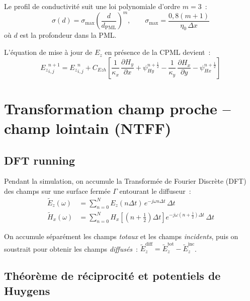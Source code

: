 \documentclass[12pt,a4paper]{article}
\newcommand{\Ez}{{E_z}}
\newcommand{\Hx}{{H_x}}
\newcommand{\Hy}{{H_y}}
\newcommand{\dx}{\Delta x}
\newcommand{\dt}{\Delta t}
\newcommand{\half}{\tfrac{1}{2}}
\numberwithin{equation}{section}
\numberwithin{figure}{section}
\numberwithin{table}{section}
\begin{document}
Le profil de conductivité suit une loi polynomiale d'ordre $m=3$~:
\begin{equation}
    \sigma(d) = \sigma_{\max}\left(\frac{d}{d_{\text{PML}}}\right)^m,
    \qquad
    \sigma_{\max} = \frac{0{,}8(m+1)}{\eta_0\,\dx}
    \label{eq:sigma_pml}
\end{equation}
où $d$ est la profondeur dans la PML.

L'équation de mise à jour de $\Ez$ en présence de la CPML devient~:
\begin{equation}
    {E_z}^{n+1}_{i,j} = {E_z}^n_{i,j} + C_{Ezh}
    \left[
        \frac{1}{\kappa_x}\,\frac{\partial \Hy}{\partial x} + \psi_{Hy}^{n+\half}
        - \frac{1}{\kappa_y}\,\frac{\partial \Hx}{\partial y} - \psi_{Hx}^{n+\half}
    \right]
    \label{eq:update_Ez_CPML}
\end{equation}

\section{Transformation champ proche -- champ lointain (NTFF)}

\subsection{DFT running}

Pendant la simulation, on accumule la Transformée de Fourier Discrète (DFT)
des champs sur une surface fermée $\Gamma$ entourant le diffuseur~:
\begin{align}
    \tilde{E}_z(\omega) &= \sum_{n=0}^{N} E_z(n\dt)\,e^{-j\omega n\dt}\,\dt
    \label{eq:DFT_Ez}\\
    \tilde{H}_x(\omega) &= \sum_{n=0}^{N} H_x\!\left[(n+\half)\dt\right]
                e^{-j\omega(n+\half)\dt}\,\dt
\end{align}

On accumule séparément les champs \emph{totaux} et les champs \emph{incidents},
puis on soustrait pour obtenir les champs \emph{diffusés}~:
$\tilde{E}_z^{\text{diff}} = \tilde{E}_z^{\text{tot}} - \tilde{E}_z^{\text{inc}}$.

\subsection{Théorème de réciprocité et potentiels de Huygens}
\end{document}
